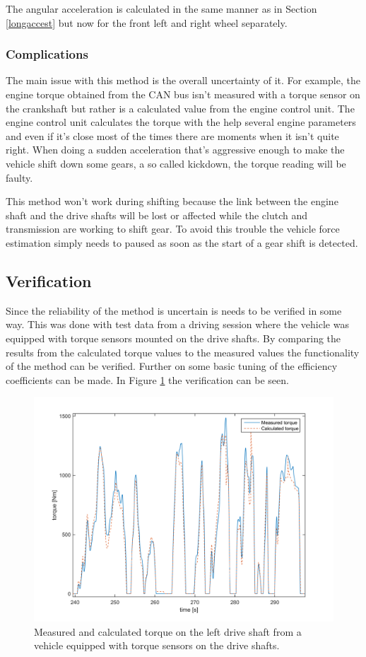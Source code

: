 The angular acceleration is calculated in the same manner as in Section \ref{longaccest} but now for the front left and right wheel separately.


\subsubsection{Complications}
The main issue with this method is the overall uncertainty of it. For example, the engine torque obtained from the CAN bus isn't measured with a torque sensor on the crankshaft but rather is a calculated value from the engine control unit. The engine control unit calculates the torque with the help several engine parameters and even if it's close most of the times there are moments when it isn't quite right. When doing a sudden acceleration that's aggressive enough to make the vehicle shift down some gears, a so called kickdown, the torque reading will be faulty. 

This method won't work during shifting because the link between the engine shaft and the drive shafts will be lost or affected while the clutch and transmission are working to shift gear. To avoid this trouble the vehicle force estimation simply needs to paused as soon as the start of a gear shift is detected.

\subsection{Verification}
Since the reliability of the method is uncertain is needs to be verified in some way. This was done with test data from a driving session where the vehicle was equipped with torque sensors mounted on the drive shafts. By comparing the results from the calculated torque values to the measured values the functionality of the method can be verified. Further on some basic tuning of the efficiency coefficients can be made. In Figure \ref{torque_ver} the verification can be seen.

\begin{figure}[h]
	\centering
	\includegraphics[width=1\textwidth]{Pictures/torque_ver}
	\caption{Measured and calculated torque on the left drive shaft from a vehicle equipped with torque sensors on the drive shafts.}
	\label{torque_ver}
\end{figure}

